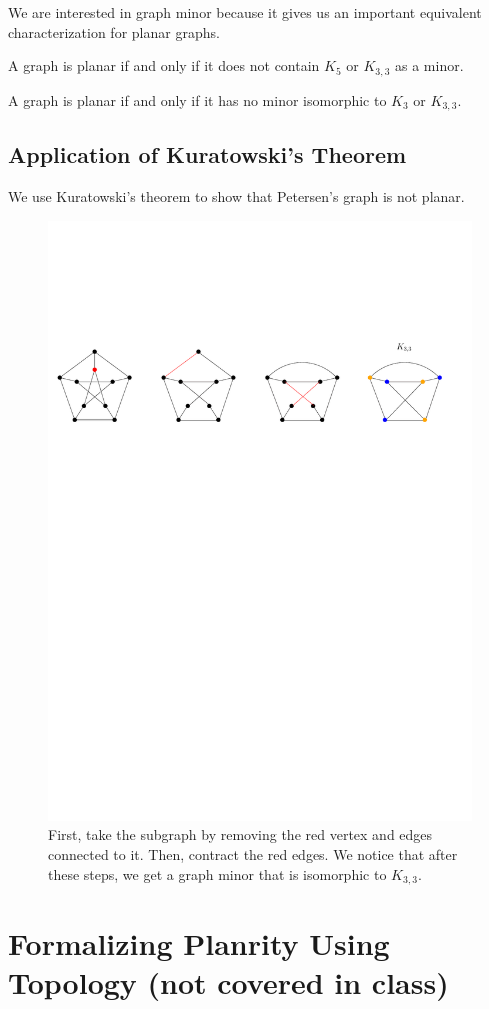We are interested in graph minor because it gives us an important equivalent characterization for planar graphs.

\begin{theorem}[Kuratowski, 1930]
    A graph is planar if and only if it does not contain $K_5$ or $K_{3,3}$ as a minor.
\end{theorem}

\begin{theorem}[Wagner, 1937]
    A graph is planar if and only if it has no minor isomorphic to $K_3$ or $K_{3,3}$.
\end{theorem}

\subsection{Application of Kuratowski's Theorem}

We use Kuratowski's theorem to show that Petersen's graph is not planar.

\begin{figure}[htbp]
    \centering
    \includegraphics[width=0.9\linewidth]{figures/petersen-graph-nonplanar.pdf}
    \caption{First, take the subgraph by removing the red vertex and edges connected to it. Then, contract the red edges. We notice that after these steps, we get a graph minor that is isomorphic to $K_{3,3}$.}
    \label{fig:petersen-graph-nonplanar}
\end{figure}

\section{Formalizing Planrity Using Topology (not covered in class)}

